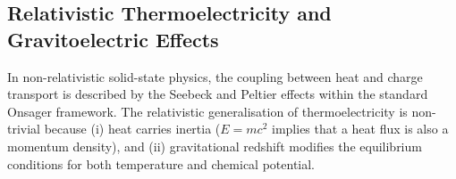 \subsection{Relativistic Thermoelectricity and Gravitoelectric Effects}
\label{subsec:rel-thermoelectricity}

In non-relativistic solid-state physics, the coupling between heat
and charge transport is described by the Seebeck and Peltier effects
within the standard Onsager framework.  The relativistic
generalisation of thermoelectricity is non-trivial because (i) heat
carries inertia ($E = mc^2$ implies that a heat flux is also a
momentum density), and (ii) gravitational redshift modifies the
equilibrium conditions for both temperature and chemical potential.

